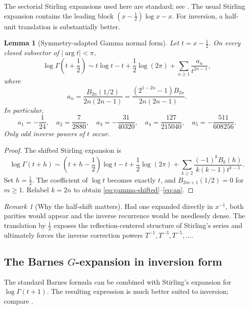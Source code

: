 \documentclass[11pt]{article}
\newtheorem{lemma}[theorem]{Lemma}
\theoremstyle{definition}
\theoremstyle{remark}
\newtheorem{remark}[theorem]{Remark}
\begin{document}
The sectorial Stirling expansions used here are standard; see \cite{DLMF,Olver}.  The usual Stirling expansion contains the leading block
\((x-\tfrac12)\log x-x\).  For inversion, a half-unit translation is substantially better.

\begin{lemma}[Symmetry-adapted Gamma normal form]\label{lem:gamma-stirling}
Let \(t=x-\tfrac12\).  On every closed subsector of
\(|\arg t|<\pi\),
\begin{equation}\label{eq:gamma-shifted}
 \log\Gamma\!\left(t+\frac12\right)
 \sim t\log t-t+\frac12\log(2\pi)
 +\sum_{n\ge1}\frac{a_n}{t^{2n-1}},
\end{equation}
where
\begin{equation}\label{eq:an}
 a_n=\frac{B_{2n}(1/2)}{2n(2n-1)}
 =\frac{(2^{1-2n}-1)B_{2n}}{2n(2n-1)}.
\end{equation}
In particular,
\[
 a_1=-\frac1{24},\quad
 a_2=\frac7{2880},\quad
 a_3=-\frac{31}{40320},\quad
 a_4=\frac{127}{215040},\quad
 a_5=-\frac{511}{608256}.
\]
Only odd inverse powers of \(t\) occur.
\end{lemma}

\begin{proof}
The shifted Stirling expansion is
\[
 \log\Gamma(t+h)
 \sim \left(t+h-\frac12\right)\log t-t+\frac12\log(2\pi)
 +\sum_{k\ge2}\frac{(-1)^kB_k(h)}{k(k-1)t^{k-1}}.
\]
Set \(h=\tfrac12\).  The coefficient of \(\log t\) becomes exactly \(t\), and
\(B_{2m+1}(1/2)=0\) for \(m\ge1\).  Relabel \(k=2n\) to obtain
\eqref{eq:gamma-shifted}--\eqref{eq:an}.
\end{proof}

\begin{remark}[Why the half-shift matters]
Had one expanded directly in \(x^{-1}\), both parities would appear and the inverse recurrence would be needlessly dense.  The translation by \(\tfrac12\) exposes the reflection-centered structure of Stirling's series and ultimately forces the inverse correction powers \(T^{-1},T^{-3},T^{-5},\ldots\).
\end{remark}

\subsection{The Barnes \texorpdfstring{\(G\)}{G}-expansion in inversion form}

The standard Barnes formula can be combined with Stirling's expansion for
\(\log\Gamma(t+1)\).  The resulting expression is much better suited to inversion; compare \cite{DLMF,FerreiraLopez,NemesBarnes}.
\end{document}
